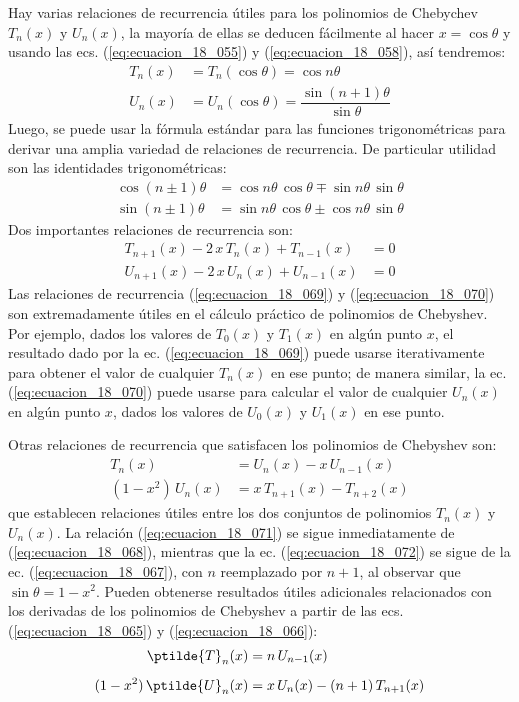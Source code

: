Hay varias relaciones de recurrencia útiles para los polinomios de Chebychev $T_{n}(x)$ y $U_{n}(x)$, la mayoría de ellas se deducen fácilmente al hacer $x = \cos \theta$ y usando las ecs. (\ref{eq:ecuacion_18_055}) y (\ref{eq:ecuacion_18_058}), así tendremos:
\begin{align}
T_{n} (x) &= T_{n} (\cos \theta) = \cos n \theta \label{eq:ecuacion_18_065} \\[0.5em]
U_{n} (x) &= U_{n} (\cos \theta) = \dfrac{\sin (n + 1) \theta}{\sin \theta} \label{eq:ecuacion_18_066} 
\end{align}
Luego, se puede usar la fórmula estándar para las funciones trigonométricas para derivar una amplia variedad de relaciones de recurrencia. De particular utilidad son las identidades trigonométricas:
\begin{align}
\cos (n \pm 1)\theta &= \cos n \theta \, \cos \theta \mp \sin n \theta \, \sin \theta \label{eq:ecuacion_18_067} \\[0.5em]
\sin (n \pm 1)\theta &= \sin n \theta \, \cos \theta \pm \cos n \theta \, \sin \theta \label{eq:ecuacion_18_068}
\end{align}
Dos importantes relaciones de recurrencia son:
\begin{align}
T_{n+1} (x) - 2 \, x \, T_{n} (x) + T_{n-1} (x) &= 0 \label{eq:ecuacion_18_069} \\[0.5em]
U_{n+1} (x) - 2 \, x \, U_{n} (x) + U_{n-1} (x) &= 0 \label{eq:ecuacion_18_070}
\end{align}
Las relaciones de recurrencia (\ref{eq:ecuacion_18_069}) y (\ref{eq:ecuacion_18_070}) son extremadamente útiles en el cálculo práctico de polinomios de Chebyshev. Por ejemplo, dados los valores de $T_{0} (x)$ y $T_{1} (x)$ en algún punto $x$, el resultado dado por la ec. (\ref{eq:ecuacion_18_069}) puede usarse iterativamente para obtener el valor de cualquier $T_{n} (x)$ en ese punto; de manera similar, la ec. (\ref{eq:ecuacion_18_070}) puede usarse para calcular el valor de cualquier $U_{n} (x)$ en algún punto $x$, dados los valores de $U_{0} (x)$ y $U_{1} (x)$ en ese punto.
\par
Otras relaciones de recurrencia que satisfacen los polinomios de Chebyshev son:
\begin{align}
T_{n} (x) &= U_{n}(x) - x \, U_{n-1} (x) \label{eq:ecuacion_18_071} \\[0.5em]
(1 - x^{2}) \, U_{n} (x) &= x \, T_{n+1} (x) - T_{n+2} (x) \label{eq:ecuacion_18_072}
\end{align}
que establecen relaciones útiles entre los dos conjuntos de polinomios $T_{n} (x)$ y $U_{n} (x)$. La relación (\ref{eq:ecuacion_18_071}) se sigue inmediatamente de (\ref{eq:ecuacion_18_068}), mientras que la ec. (\ref{eq:ecuacion_18_072}) se sigue de la ec. (\ref{eq:ecuacion_18_067}), con $n$ reemplazado por $n + 1$, al observar que $\sin \theta = 1 - x^{2}$. Pueden obtenerse resultados útiles adicionales relacionados con los derivadas de los polinomios de Chebyshev a partir de las ecs. (\ref{eq:ecuacion_18_065}) y (\ref{eq:ecuacion_18_066}):
\begin{align*}
\ptilde{T}_{n} (x) &= n \, U_{n-1} (x) \\[0.5em]
(1 - x^{2}) \, \ptilde{U}_{n} (x) &= x \, U_{n} (x) - (n + 1) \, T_{n+1} (x)
\end{align*}
